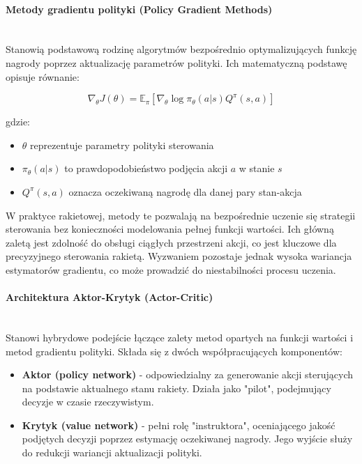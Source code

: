 \paragraph{Metody gradientu polityki (Policy Gradient Methods) \cite{ciosek2020expectedpolicygradientsreinforcement}}\\
Stanowią podstawową rodzinę algorytmów bezpośrednio optymalizujących funkcję nagrody poprzez aktualizację parametrów polityki. Ich matematyczną podstawę opisuje równanie:

\begin{equation}
    \nabla_\theta J(\theta) = \mathbb{E}_\pi\left[\nabla_\theta \log \pi_\theta(a|s) Q^\pi(s,a)\right]
    \label{eq:policy_gradient}
\end{equation}

gdzie:
\begin{itemize}
    \item $\theta$ reprezentuje parametry polityki sterowania
    \item $\pi_\theta(a|s)$ to prawdopodobieństwo podjęcia akcji $a$ w stanie $s$
    \item $Q^\pi(s,a)$ oznacza oczekiwaną nagrodę dla danej pary stan-akcja
\end{itemize}

W praktyce rakietowej, metody te pozwalają na bezpośrednie uczenie się
strategii sterowania bez konieczności modelowania pełnej funkcji wartości.
Ich główną zaletą jest zdolność do obsługi ciągłych przestrzeni akcji, co jest kluczowe dla precyzyjnego sterowania rakietą. Wyzwaniem pozostaje jednak wysoka wariancja estymatorów gradientu, co może prowadzić do niestabilności procesu uczenia.\\

\paragraph{Architektura Aktor-Krytyk (Actor-Critic) \cite{han2020actorcriticreinforcementlearningcontrol}}\\
Stanowi hybrydowe podejście łączące zalety metod opartych na funkcji wartości i metod gradientu polityki. Składa się z dwóch współpracujących komponentów:

\begin{itemize}
    \item \textbf{Aktor (policy network)} - odpowiedzialny za generowanie akcji sterujących na podstawie aktualnego stanu rakiety. Działa jako "pilot", podejmujący decyzje w czasie rzeczywistym.

    \item \textbf{Krytyk (value network)} - pełni rolę "instruktora", oceniającego jakość podjętych decyzji poprzez estymację oczekiwanej nagrody. Jego wyjście służy do redukcji wariancji aktualizacji polityki.
\end{itemize}

